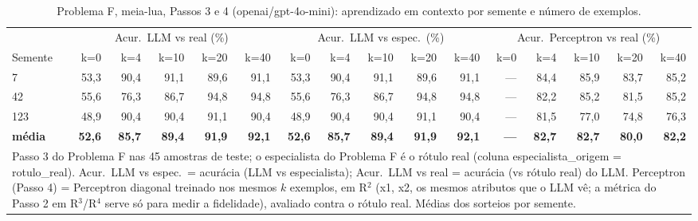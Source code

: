 \begin{table}[htbp]
\centering
\footnotesize
\caption{Problema F, meia-lua, Passos 3 e 4 (openai/gpt-4o-mini): aprendizado em contexto por semente e número de exemplos.}
\label{tab:bloco2_F_passo3_k_gpt4mini}
\begin{tabular}{lrrrrrrrrrrrrrrr}
\toprule
 & \multicolumn{5}{c}{Acur.\ LLM vs real (\%)} & \multicolumn{5}{c}{Acur.\ LLM vs espec.\ (\%)} & \multicolumn{5}{c}{Acur.\ Perceptron vs real (\%)} \\ \cmidrule(lr){2-6} \cmidrule(lr){7-11} \cmidrule(lr){12-16}
Semente & k=0 & k=4 & k=10 & k=20 & k=40 & k=0 & k=4 & k=10 & k=20 & k=40 & k=0 & k=4 & k=10 & k=20 & k=40 \\
\midrule
7 & 53,3 & 90,4 & 91,1 & 89,6 & 91,1 & 53,3 & 90,4 & 91,1 & 89,6 & 91,1 & — & 84,4 & 85,9 & 83,7 & 85,2 \\
42 & 55,6 & 76,3 & 86,7 & 94,8 & 94,8 & 55,6 & 76,3 & 86,7 & 94,8 & 94,8 & — & 82,2 & 85,2 & 81,5 & 85,2 \\
123 & 48,9 & 90,4 & 90,4 & 91,1 & 90,4 & 48,9 & 90,4 & 90,4 & 91,1 & 90,4 & — & 81,5 & 77,0 & 74,8 & 76,3 \\
\midrule
\textbf{média} & \textbf{52,6} & \textbf{85,7} & \textbf{89,4} & \textbf{91,9} & \textbf{92,1} & \textbf{52,6} & \textbf{85,7} & \textbf{89,4} & \textbf{91,9} & \textbf{92,1} & \textbf{—} & \textbf{82,7} & \textbf{82,7} & \textbf{80,0} & \textbf{82,2} \\
\bottomrule
\multicolumn{16}{p{0.95\linewidth}}{\footnotesize Passo 3 do Problema F nas 45 amostras de teste; o especialista do Problema F é o rótulo real (coluna especialista\_origem = rotulo\_real). Acur.\ LLM vs espec.\ = acurácia (LLM vs especialista); Acur.\ LLM vs real = acurácia (vs rótulo real) do LLM. Perceptron (Passo 4) = Perceptron diagonal treinado nos mesmos $k$ exemplos, em R$^2$ (x1, x2, os mesmos atributos que o LLM vê; a métrica do Passo 2 em R$^3$/R$^4$ serve só para medir a fidelidade), avaliado contra o rótulo real. Médias dos sorteios por semente.} \\
\end{tabular}
\end{table}
